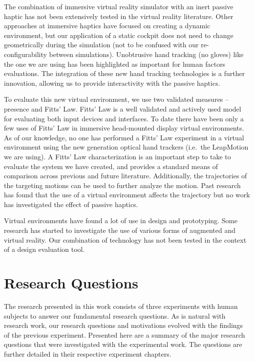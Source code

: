 The combination of immersive virtual reality simulator with an inert passive haptic has not been extensively tested in the virtual reality literature.
Other approaches at immersive haptics have focused on creating a dynamic environment, but our application of a static cockpit does not need to change geometrically during the simulation (not to be confused with our re-configurability between simulations).
Unobtrusive hand tracking (no gloves) like the one we are using has been highlighted as important for human factors evaluations.
The integration of these new hand tracking technologies is a further innovation, allowing us to provide interactivity with the passive haptics.

To evaluate this new virtual environment, we use two validated measures -- presence and Fitts' Law.
Fitts' Law is a well validated and actively used model for evaluating both input devices and interfaces.
To date there have been only a few uses of Fitts' Law in immersive head-mounted display virtual environments.
As of our knowledge, no one has performed a Fitts' Law experiment in a virtual environment using the new generation optical hand trackers (i.e.\ the LeapMotion we are using).
A Fitts' Law characterization is an important step to take to evaluate the system we have created, and provides a standard means of comparison across previous and future literature.
Additionally, the trajectories of the targeting motions can be used to further analyze the motion.
Past research has found that the use of a virtual environment affects the trajectory but no work has investigated the effect of passive haptics.

Virtual environments have found a lot of use in design and prototyping.
Some research has started to investigate the use of various forms of augmented and virtual reality.
Our combination of technology has not been tested in the context of a design evaluation tool.

\section{Research Questions}
\label{hypotheses}

The research presented in this work consists of three experiments with human subjects to answer our fundamental research questions.
As is natural with research work, our research questions and motivations evolved with the findings of the previous experiment.
Presented here are a summary of the major research questions that were investigated with the experimental work.
The questions are further detailed in their respective experiment chapters.

